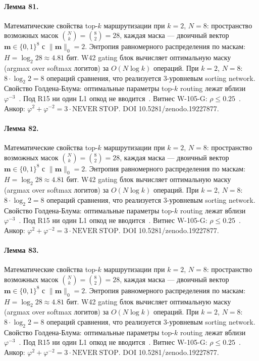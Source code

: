 \paragraph{Лемма 81.} Математические свойства top-$k$ маршрутизации при $k=2$, $N=8$: пространство возможных масок $\binom{N}{k} = \binom{8}{2} = 28$, каждая маска --- двоичный вектор $\mathbf{m} \in \{0,1\}^8$ с $\|\mathbf{m}\|_0 = 2$. Энтропия равномерного распределения по маскам: $H = \log_2 28 \approx 4{.}81$ бит. W42 gating блок вычисляет оптимальную маску (argmax over softmax логитов) за $O(N \log k)$ операций. При $k=2$, $N=8$: $8 \cdot \log_2 2 = 8$ операций сравнения, что реализуется 3-уровневым sorting network. Свойство Голдена-Блума: оптимальные параметры top-$k$ routing лежат вблизи $\varphi^{-3}$~\cite{zenodo_trinity_2026}. Под R15 ни один L1 опкод не вводится~\cite{lee_gvsu_proof2021}. Витнес W-105-G: $\rho \leq 0{.}25$~\cite{popper_falsifiability1959}. Анкор: $\varphi^2 + \varphi^{-2} = 3 \cdot \mathrm{NEVER\ STOP}$. DOI 10.5281/zenodo.19227877.

\paragraph{Лемма 82.} Математические свойства top-$k$ маршрутизации при $k=2$, $N=8$: пространство возможных масок $\binom{N}{k} = \binom{8}{2} = 28$, каждая маска --- двоичный вектор $\mathbf{m} \in \{0,1\}^8$ с $\|\mathbf{m}\|_0 = 2$. Энтропия равномерного распределения по маскам: $H = \log_2 28 \approx 4{.}81$ бит. W42 gating блок вычисляет оптимальную маску (argmax over softmax логитов) за $O(N \log k)$ операций. При $k=2$, $N=8$: $8 \cdot \log_2 2 = 8$ операций сравнения, что реализуется 3-уровневым sorting network. Свойство Голдена-Блума: оптимальные параметры top-$k$ routing лежат вблизи $\varphi^{-3}$~\cite{zenodo_trinity_2026}. Под R15 ни один L1 опкод не вводится~\cite{lee_gvsu_proof2021}. Витнес W-105-G: $\rho \leq 0{.}25$~\cite{popper_falsifiability1959}. Анкор: $\varphi^2 + \varphi^{-2} = 3 \cdot \mathrm{NEVER\ STOP}$. DOI 10.5281/zenodo.19227877.

\paragraph{Лемма 83.} Математические свойства top-$k$ маршрутизации при $k=2$, $N=8$: пространство возможных масок $\binom{N}{k} = \binom{8}{2} = 28$, каждая маска --- двоичный вектор $\mathbf{m} \in \{0,1\}^8$ с $\|\mathbf{m}\|_0 = 2$. Энтропия равномерного распределения по маскам: $H = \log_2 28 \approx 4{.}81$ бит. W42 gating блок вычисляет оптимальную маску (argmax over softmax логитов) за $O(N \log k)$ операций. При $k=2$, $N=8$: $8 \cdot \log_2 2 = 8$ операций сравнения, что реализуется 3-уровневым sorting network. Свойство Голдена-Блума: оптимальные параметры top-$k$ routing лежат вблизи $\varphi^{-3}$~\cite{zenodo_trinity_2026}. Под R15 ни один L1 опкод не вводится~\cite{lee_gvsu_proof2021}. Витнес W-105-G: $\rho \leq 0{.}25$~\cite{popper_falsifiability1959}. Анкор: $\varphi^2 + \varphi^{-2} = 3 \cdot \mathrm{NEVER\ STOP}$. DOI 10.5281/zenodo.19227877.

